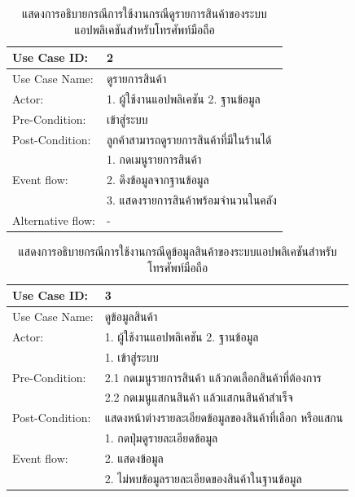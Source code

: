 \begin{table}[htbp]
  \centering
  \caption{แสดงการอธิบายกรณีการใช้งานกรณีดูรายการสินค้าของระบบแอปพลิเคชันสำหรับโทรศัพท์มือถือ}
  \begin{tabularx}{\textwidth}{|p{3cm}|X|}
    \hline
    \multirow{1}{3cm}{Use Case ID:}      & 2                              \\
    \hline
    \multirow{1}{3cm}{Use Case Name:}    & ดูรายการสินค้า                    \\
    \hline
    \multirow{1}{3cm}{Actor:}            & 1. ผู้ใช้งานแอปพลิเคชัน 2. ฐานข้อมูล  \\
    \hline
    \multirow{1}{3cm}{Pre-Condition:}    & เข้าสู่ระบบ                       \\
    \hline
    \multirow{1}{3cm}{Post-Condition:}   & ลูกค้าสามารถดูรายการสินค้าที่มีในร้านได้ \\
    \hline
    \multirow{3}{3cm}{Event flow:}       & 1. กดเมนูรายการสินค้า             \\
                                         & 2. ดึงข้อมูลจากฐานข้อมูล            \\ & 3. แสดงรายการสินค้าพร้อมจำนวนในคลัง \\
    \hline
    \multirow{1}{3cm}{Alternative flow:} & -                              \\
    \hline
  \end{tabularx}
\end{table}

\begin{table}[htbp]
  \centering
  \caption{แสดงการอธิบายกรณีการใช้งานกรณีดูข้อมูลสินค้าของระบบแอปพลิเคชันสำหรับโทรศัพท์มือถือ}
  \begin{tabularx}{\textwidth}{|p{3cm}|X|}
    \hline
    \multirow{1}{3cm}{Use Case ID:}      & 3                                           \\
    \hline
    \multirow{1}{3cm}{Use Case Name:}    & ดูข้อมูลสินค้า                                   \\
    \hline
    \multirow{1}{3cm}{Actor:}            & 1. ผู้ใช้งานแอปพลิเคชัน 2. ฐานข้อมูล               \\
    \hline
    \multirow{3}{3cm}{Pre-Condition:}    & 1. เข้าสู่ระบบ                                 \\ & 2.1 กดเมนูรายการสินค้า แล้วกดเลือกสินค้าที่ต้องการ \\
                                         & 2.2 กดเมนูแสกนสินค้า แล้วแสกนสินค้าสำเร็จ           \\
    \hline
    \multirow{1}{3cm}{Post-Condition:}   & แสดงหน้าต่างรายละเอียดข้อมูลของสินค้าที่เลือก หรือแสกน \\
    \hline
    \multirow{3}{3cm}{Event flow:}       & 1. กดปุ่มดูรายละเอียดข้อมูล                       \\
                                         & 2. แสดงข้อมูล                                 \\
    \hline
    \multirow{1}{3cm}{Alternative flow:} & 2. ไม่พบข้อมูลรายละเอียดของสินค้าในฐานข้อมูล        \\
    \hline
  \end{tabularx}
\end{table}

